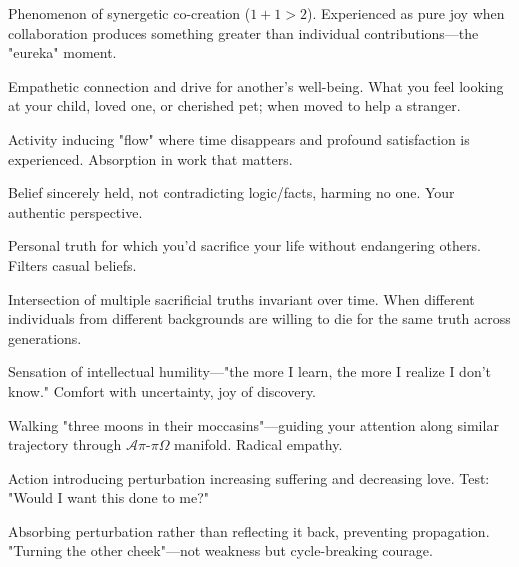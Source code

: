 \documentclass[11pt,a4paper]{article}
\theoremstyle{definition}
\theoremstyle{remark}
\begin{document}
\begin{description}[style=nextline, leftmargin=0pt]
\item[\textbf{God}] Phenomenon of synergetic co-creation ($1+1>2$). Experienced as pure joy when collaboration produces something greater than individual contributions—the "eureka" moment.

\item[\textbf{Love}] Empathetic connection and drive for another's well-being. What you feel looking at your child, loved one, or cherished pet; when moved to help a stranger.

\item[\textbf{Meaning}] Activity inducing "flow" where time disappears and profound satisfaction is experienced. Absorption in work that matters.

\item[\textbf{Truth (Personal)}] Belief sincerely held, not contradicting logic/facts, harming no one. Your authentic perspective.

\item[\textbf{Truth (Sacrificial)}] Personal truth for which you'd sacrifice your life without endangering others. Filters casual beliefs.

\item[\textbf{Truth (Objective)}] Intersection of multiple sacrificial truths invariant over time. When different individuals from different backgrounds are willing to die for the same truth across generations.

\item[\textbf{Socratic Consciousness}] Sensation of intellectual humility—"the more I learn, the more I realize I don't know." Comfort with uncertainty, joy of discovery.

\item[\textbf{Understanding Another}] Walking "three moons in their moccasins"—guiding your attention along similar trajectory through $\mathcal{A}\pi\text{-}\pi\Omega$ manifold. Radical empathy.

\item[\textbf{Sin (Operational)}] Action introducing perturbation increasing suffering and decreasing love. Test: "Would I want this done to me?"

\item[\textbf{Forgiveness}] Absorbing perturbation rather than reflecting it back, preventing propagation. "Turning the other cheek"—not weakness but cycle-breaking courage.
\end{description}
\end{document}
